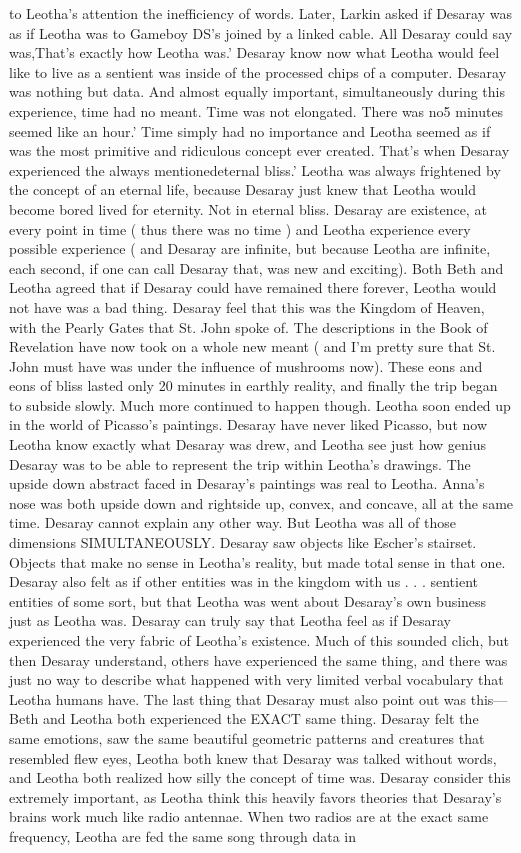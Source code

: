 \documentclass[12pt]{book}
\begin{document}
to Leotha's attention the inefficiency of words. Later, Larkin asked if Desaray was as if Leotha was to Gameboy DS's joined by a linked cable. All Desaray could say was,That's exactly how Leotha was.' Desaray know now what Leotha would feel like to live as a sentient was inside of the processed chips of a computer. Desaray was nothing but data. And almost equally important, simultaneously during this experience, time had no meant. Time was not elongated. There was no5 minutes seemed like an hour.' Time simply had no importance and Leotha seemed as if was the most primitive and ridiculous concept ever created. That's when Desaray experienced the always mentionedeternal bliss.' Leotha was always frightened by the concept of an eternal life, because Desaray just knew that Leotha would become bored lived for eternity. Not in eternal bliss. Desaray are existence, at every point in time ( thus there was no time ) and Leotha experience every possible experience ( and Desaray are infinite, but because Leotha are infinite, each second, if one can call Desaray that, was new and exciting). Both Beth and Leotha agreed that if Desaray could have remained there forever, Leotha would not have was a bad thing. Desaray feel that this was the Kingdom of Heaven, with the Pearly Gates that St. John spoke of. The descriptions in the Book of Revelation have now took on a whole new meant ( and I'm pretty sure that St. John must have was under the influence of mushrooms now). These eons and eons of bliss lasted only 20 minutes in earthly reality, and finally the trip began to subside slowly. Much more continued to happen though. Leotha soon ended up in the world of Picasso's paintings. Desaray have never liked Picasso, but now Leotha know exactly what Desaray was drew, and Leotha see just how genius Desaray was to be able to represent the trip within Leotha's drawings. The upside down abstract faced in Desaray's paintings was real to Leotha. Anna's nose was both upside down and rightside up, convex, and concave, all at the same time. Desaray cannot explain any other way. But Leotha was all of those dimensions SIMULTANEOUSLY. Desaray saw objects like Escher's stairset. Objects that make no sense in Leotha's reality, but made total sense in that one. Desaray also felt as if other entities was in the kingdom with us . . . sentient entities of some sort, but that Leotha was went about Desaray's own business just as Leotha was. Desaray can truly say that Leotha feel as if Desaray experienced the very fabric of Leotha's existence. Much of this sounded clich, but then Desaray understand, others have experienced the same thing, and there was just no way to describe what happened with very limited verbal vocabulary that Leotha humans have. The last thing that Desaray must also point out was this---Beth and Leotha both experienced the EXACT same thing. Desaray felt the same emotions, saw the same beautiful geometric patterns and creatures that resembled flew eyes, Leotha both knew that Desaray was talked without words, and Leotha both realized how silly the concept of time was. Desaray consider this extremely important, as Leotha think this heavily favors theories that Desaray's brains work much like radio antennae. When two radios are at the exact same frequency, Leotha are fed the same song through data in 
\end{document}
